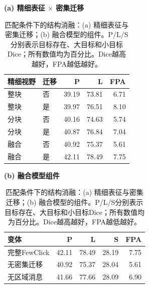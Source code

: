 \begin{table}[t]
\centering
\caption{匹配条件下的结构消融：(a) 精细表征与密集迁移；(b) 融合模型的组件。P/L/S分别表示目标存在、大目标和小目标Dice；所有数值均为百分比。Dice越高越好，FPA越低越好。}
\label{tab:ablation}
\small
\setlength{\tabcolsep}{4pt}
\textbf{(a) 精细表征 $\times$ 密集迁移}\\[2pt]
\begin{tabular}{@{}llrrr@{}}
\toprule
精细视野 & 迁移 & P & L & FPA \\
\midrule
整块 & 否 & 39.19 & 73.81 & 6.71 \\
整块 & 是 & 39.97 & 76.51 & 8.10 \\
分块 & 否 & 40.16 & 74.63 & 5.74 \\
分块 & 是 & 40.87 & 76.84 & 7.04 \\
融合 & 否 & 40.92 & 75.37 & 5.61 \\
融合 & 是 & 42.11 & 78.49 & 7.75 \\
\bottomrule
\end{tabular}
\par\vspace{4pt}
\textbf{(b) 融合模型组件}\\[2pt]
\begin{tabular}{@{}lrrrr@{}}
\toprule
变体 & P & L & S & FPA \\
\midrule
完整FewClick & 42.11 & 78.49 & 28.19 & 7.75 \\
无密集迁移 & 40.92 & 75.37 & 28.04 & 5.61 \\
无区域消息 & 41.66 & 77.66 & 28.09 & 6.90 \\
\bottomrule
\end{tabular}
\end{table}
